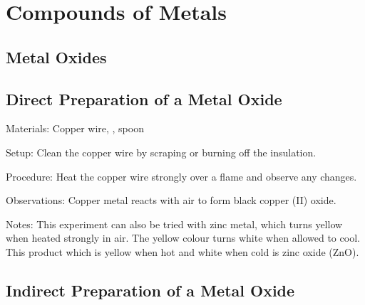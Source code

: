 \section{Compounds of Metals}

\begin{multicols}{2}


\section*{Metal Oxides}


\subsection{Direct Preparation of a Metal Oxide}


\begin{description*}
\item[Materials:]{Copper wire, , spoon}
\item[Setup:]{Clean the copper wire by scraping or burning off the insulation.}
\item[Procedure:]{Heat the copper wire strongly over a flame and observe any changes.}
\item[Observations:]{Copper metal reacts with air to form black copper (II) oxide.}
\item[Notes:]{This experiment can also be tried with zinc metal, which turns yellow
when heated strongly in air. The yellow colour turns white when allowed to
cool. This product which is yellow when hot and white when cold is zinc
oxide (ZnO).}
\end{description*}

\subsection{Indirect Preparation of a Metal Oxide}



\end{multicols}
